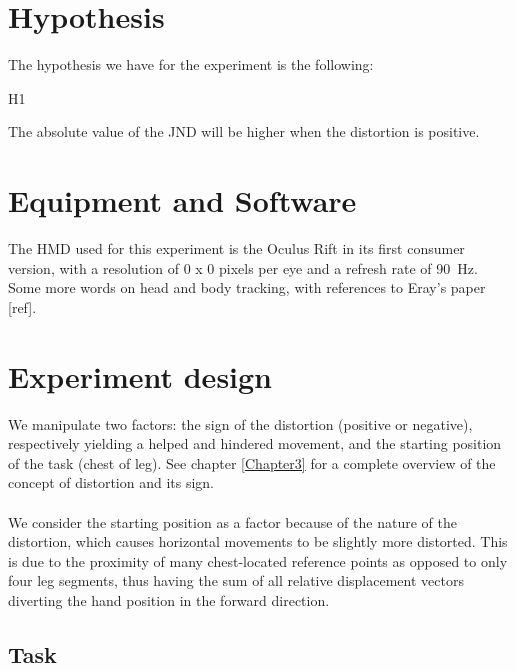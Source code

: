 \section{Hypothesis}

The hypothesis we have for the experiment is the following:

\begin{labeling}{H1}
  \item [H1] The absolute value of the JND will be higher when the distortion is positive.
\end{labeling}

\section{Equipment and Software}

The HMD used for this experiment is the Oculus Rift in its first consumer version, with a resolution of 0 x 0 pixels per eye and a refresh rate of \SI{90}{\hertz}.
Some more words on head and body tracking, with references to Eray's paper [ref].

\section{Experiment design}

We manipulate two factors: the sign of the distortion (positive or negative), respectively yielding a helped and hindered movement, and the starting position of the task (chest of leg). See chapter \ref{Chapter3} for a complete overview of the concept of distortion and its sign.
\\\\
We consider the starting position as a factor because of the nature of the distortion, which causes horizontal movements to be slightly more distorted. This is due to the proximity of many chest-located reference points as opposed to only four leg segments, thus having the sum of all relative displacement vectors diverting the hand position in the forward direction.

\subsection{Task}


